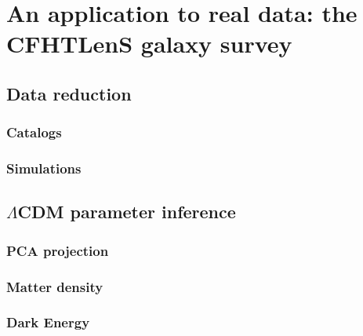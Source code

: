 
\chapter{An application to real data: the CFHTLenS galaxy survey}
\lhead[\fancyplain{}{\thepage}]{\fancyplain{}{\rightmark}}
 \thispagestyle{plain}
\setlength{\parindent}{10mm}

\label{chp:6}

\section{Data reduction}

\subsection{Catalogs}
\subsection{Simulations}

\section{$\Lambda$CDM parameter inference}

\subsection{PCA projection}

\subsection{Matter density}

\subsection{Dark Energy}


%